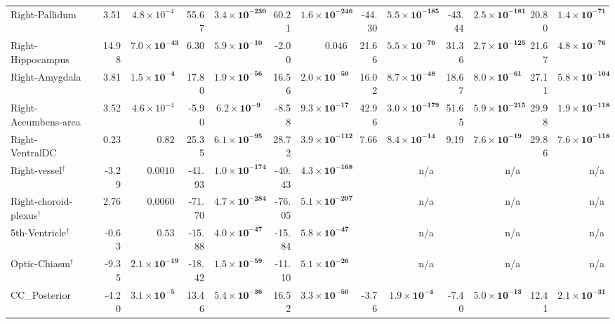 {\begin{longtable}{llrrrrrrrrrrrr}
Right-Pallidum &  & 3.51 & $4.8{\times}10^{-4}$ & 55.67 & $\mathbf{3.4{\times}10^{-230}}$ & 60.21 & $\mathbf{1.6{\times}10^{-246}}$ & -44.30 & $\mathbf{5.5{\times}10^{-185}}$ & -43.44 & $\mathbf{2.5{\times}10^{-181}}$ & 20.80 & $\mathbf{1.4{\times}10^{-71}}$ \\
Right-Hippocampus &  & 14.98 & $\mathbf{7.0{\times}10^{-43}}$ & 6.30 & $\mathbf{5.9{\times}10^{-10}}$ & -2.00 & $0.046$ & 21.66 & $\mathbf{5.5{\times}10^{-76}}$ & 31.36 & $\mathbf{2.7{\times}10^{-125}}$ & 21.67 & $\mathbf{4.8{\times}10^{-76}}$ \\
Right-Amygdala &  & 3.81 & $\mathbf{1.5{\times}10^{-4}}$ & 17.80 & $\mathbf{1.9{\times}10^{-56}}$ & 16.56 & $\mathbf{2.0{\times}10^{-50}}$ & 16.02 & $\mathbf{8.7{\times}10^{-48}}$ & 18.67 & $\mathbf{8.0{\times}10^{-61}}$ & 27.11 & $\mathbf{5.8{\times}10^{-104}}$ \\
Right-Accumbens-area &  & 3.52 & $4.6{\times}10^{-4}$ & -5.90 & $\mathbf{6.2{\times}10^{-9}}$ & -8.58 & $\mathbf{9.3{\times}10^{-17}}$ & 42.96 & $\mathbf{3.0{\times}10^{-179}}$ & 51.65 & $\mathbf{5.9{\times}10^{-215}}$ & 29.98 & $\mathbf{1.9{\times}10^{-118}}$ \\
Right-VentralDC &  & 0.23 & $0.82$ & 25.35 & $\mathbf{6.1{\times}10^{-95}}$ & 28.72 & $\mathbf{3.9{\times}10^{-112}}$ & 7.66 & $\mathbf{8.4{\times}10^{-14}}$ & 9.19 & $\mathbf{7.6{\times}10^{-19}}$ & 29.86 & $\mathbf{7.6{\times}10^{-118}}$ \\
Right-vessel$^{\dagger}$ &  & -3.29 & $0.0010$ & -41.93 & $\mathbf{1.0{\times}10^{-174}}$ & -40.43 & $\mathbf{4.3{\times}10^{-168}}$ &  & n/a &  & n/a &  & n/a \\
Right-choroid-plexus$^{\dagger}$ &  & 2.76 & $0.0060$ & -71.70 & $\mathbf{4.7{\times}10^{-284}}$ & -76.05 & $\mathbf{5.1{\times}10^{-297}}$ &  & n/a &  & n/a &  & n/a \\
5th-Ventricle$^{\dagger}$ &  & -0.63 & $0.53$ & -15.88 & $\mathbf{4.0{\times}10^{-47}}$ & -15.84 & $\mathbf{5.8{\times}10^{-47}}$ &  & n/a &  & n/a &  & n/a \\
Optic-Chiasm$^{\dagger}$ &  & -9.35 & $\mathbf{2.1{\times}10^{-19}}$ & -18.42 & $\mathbf{1.5{\times}10^{-59}}$ & -11.10 & $\mathbf{5.1{\times}10^{-26}}$ &  & n/a &  & n/a &  & n/a \\
CC\_Posterior &  & -4.20 & $\mathbf{3.1{\times}10^{-5}}$ & 13.46 & $\mathbf{5.4{\times}10^{-36}}$ & 16.52 & $\mathbf{3.3{\times}10^{-50}}$ & -3.76 & $\mathbf{1.9{\times}10^{-4}}$ & -7.40 & $\mathbf{5.0{\times}10^{-13}}$ & 12.41 & $\mathbf{2.1{\times}10^{-31}}$ \\

\end{longtable}}
